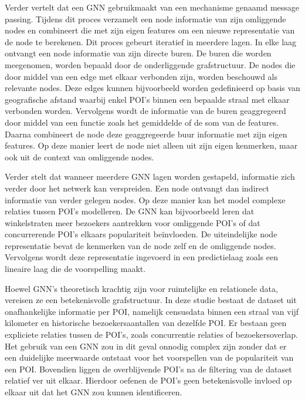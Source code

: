 Verder vertelt \textcite{Khemani2024} dat een GNN gebruikmaakt van een mechanisme genaamd message passing. Tijdens dit proces verzamelt een node informatie van zijn omliggende nodes en combineert die met zijn eigen features om een nieuwe representatie van de node te berekenen. Dit proces gebeurt iteratief in meerdere lagen. In elke laag ontvangt een node informatie van zijn directe buren. De buren die worden meegenomen, worden bepaald door de onderliggende grafstructuur. De nodes die door middel van een edge met elkaar verbonden zijn, worden beschouwd als relevante nodes. Deze edges kunnen bijvoorbeeld worden gedefinieerd op basis van geografische afstand waarbij enkel POI’s binnen een bepaalde straal met elkaar verbonden worden. Vervolgens wordt de informatie van de buren geaggregeerd door middel van een functie zoals het gemiddelde of de som van de features. Daarna combineert de node deze geaggregeerde buur informatie met zijn eigen features. Op deze manier leert de node niet alleen uit zijn eigen kenmerken, maar ook uit de context van omliggende nodes.

Verder stelt \textcite{Battaglia2018} dat wanneer meerdere GNN lagen worden gestapeld, informatie zich verder door het netwerk kan verspreiden. Een node ontvangt dan indirect informatie van verder gelegen nodes. Op deze manier kan het model complexe relaties tussen POI’s modelleren. De GNN kan bijvoorbeeld leren dat winkelstraten meer bezoekers aantrekken voor omliggende POI’s of dat concurrerende POI’s elkaars populariteit beïnvloeden. De uiteindelijke node representatie bevat de kenmerken van de node zelf en de omliggende nodes. Vervolgens wordt deze representatie ingevoerd in een predictielaag zoals een lineaire laag die de voorspelling maakt.

Hoewel GNN’s theoretisch krachtig zijn voor ruimtelijke en relationele data, vereisen ze een betekenisvolle grafstructuur. In deze studie bestaat de dataset uit onafhankelijke informatie per POI, namelijk censusdata binnen een straal van vijf kilometer en historische bezoekersaantallen van dezelfde POI. Er bestaan geen expliciete relaties tussen de POI’s, zoals concurrentie relaties of bezoekersoverlap. Het gebruik van een GNN zou in dit geval onnodig complex zijn zonder dat er een duidelijke meerwaarde ontstaat voor het voorspellen van de populariteit van een POI. Bovendien liggen de overblijvende POI’s na de filtering van de dataset relatief ver uit elkaar. Hierdoor oefenen de POI's geen betekenisvolle invloed op elkaar uit dat het GNN zou kunnen identificeren.

